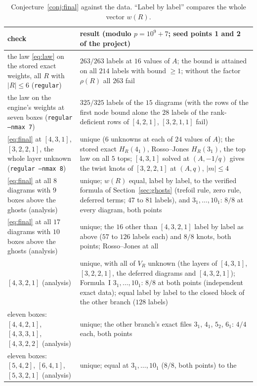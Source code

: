 \documentclass[11pt]{article}
\newcommand{\LMPH}[1]{\texttt{#1}}
\begin{document}
{\small
\begin{longtable}{>{\raggedright\arraybackslash}p{}>{\raggedright\arraybackslash}p{}}
\caption{Conjecture~\ref{conj:final} against the data.  ``Label by label'' compares the whole vector $w(R)$.}\label{tab:final}\\
\toprule
check & result (modulo $p=10^9+7$; seed points 1 and 2 of the project)\\
\midrule
\endhead
the law \eqref{eq:law} on the stored exact weights, all $R$ with $|R|\le6$ (\LMPH{regular}) & $263/263$ labels at $16$
values of $A$; the bound is attained on all $214$ labels with bound $\ge1$; without the factor $\rho(R)$ all $263$ fail\\
the law on the engine's weights at seven boxes (\LMPH{regular --nmax 7}) & $325/325$ labels of the $15$ diagrams (with
the rows of the first node bound alone the $28$ labels of the rank-deficient rows of $[4,2,1]$, $[3,2,1,1]$ fail)\\
\eqref{eq:final} at $[4,3,1]$, $[3,2,2,1]$, the whole layer unknown (\LMPH{regular --nmax 8}) & unique ($6$ unknowns at
each of $24$ values of $A$); the stored exact $H_R(4_1)$, Rosso--Jones $H_R(3_1)$, the top law on all $5$ tops; $[4,3,1]$
solved at $(A,-1/q)$ gives the twist knots of $[3,2,2,1]$ at $(A,q)$, $|m|\le4$\\
\eqref{eq:final} at all $8$ diagrams with $9$ boxes above the ghosts (analysis) & unique; $w(R)$ equal, label by label, to the
verified formula of Section~\ref{sec:ghosts} (trefoil rule, zero rule, deferred terms; $47$ to $81$ labels), and
$3_1,\dots,10_1$: $8/8$ at every diagram, both points\\
\eqref{eq:final} at all $17$ diagrams with $10$ boxes above the ghosts (analysis) & unique; the $16$ other than
$[4,3,2,1]$ label by label as above ($57$ to $126$ labels each) and $8/8$ knots, both points; Rosso--Jones at all\\
$[4,3,2,1]$ (analysis) & unique, with all of $V_R$ unknown (the layers of $[4,3,1]$, $[3,2,2,1]$, the deferred diagrams and
$[4,3,2,1]$); Formula~I $3_1,\dots,10_1$: $8/8$ at both points (independent exact data); equal label by label to the closed
block of the other branch ($128$ labels)\\
eleven boxes: $[4,4,2,1]$, $[4,3,3,1]$, $[4,3,2,2]$ (analysis) & unique; the other branch's exact files $3_1$, $4_1$, $5_2$,
$6_1$: $4/4$ each, both points\\
eleven boxes: $[5,4,2]$, $[6,4,1]$, $[5,3,2,1]$ (analysis) & unique; equal at $3_1,\dots,10_1$ ($8/8$, both points) to the

\end{longtable}}
\end{document}
